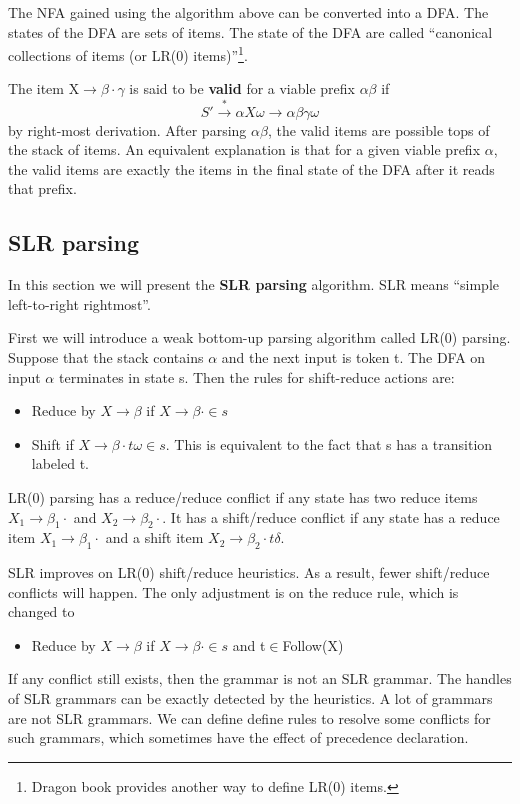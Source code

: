 The NFA gained using the algorithm above can be converted into a DFA. The states of the DFA are sets of items. The state of the DFA are called ``canonical collections of items (or LR(0) items)''\footnote{Dragon book provides another way to define LR(0) items.}.

The item X$\rightarrow\beta\cdot\gamma$ is said to be \textbf{valid} for a viable prefix $\alpha\beta$ if
\begin{equation*}
S' \xrightarrow{*}\alpha X\omega\rightarrow\alpha\beta\gamma\omega
\end{equation*}
by right-most derivation. After parsing $\alpha\beta$, the valid items are possible tops of the stack of items. An equivalent explanation is that for a given viable prefix $\alpha$, the valid items are exactly the items in the final state of the DFA after it reads that prefix.
\subsection{SLR parsing}
In this section we will present the {\bf SLR parsing} algorithm. SLR means ``simple left-to-right rightmost''.

First we will introduce a weak bottom-up parsing algorithm called LR(0) parsing. Suppose that the stack contains $\alpha$ and the next input is token t. The DFA on input $\alpha$ terminates in state s. Then the rules for shift-reduce actions are:
\begin{itemize}
\item Reduce by $X\rightarrow\beta$ if $X\rightarrow\beta\cdot\in s$
\item Shift if $X\rightarrow\beta\cdot t\omega\in s$. This is equivalent to the fact that s has a transition labeled t.
\end{itemize}
LR(0) parsing has a reduce/reduce conflict if any state has two reduce items $X_1\rightarrow\beta_1\cdot$ and $X_2\rightarrow\beta_2\cdot$. It has a shift/reduce conflict if any state has a reduce item $X_1\rightarrow\beta_1\cdot$ and a shift item $X_2\rightarrow\beta_2\cdot t\delta$.

SLR improves on LR(0) shift/reduce heuristics. As a result, fewer shift/reduce conflicts will happen. The only adjustment is on the reduce rule, which is changed to 
\begin{itemize}
\item Reduce by $X\rightarrow\beta$ if $X\rightarrow\beta\cdot\in s$ and t$\in$Follow(X)
\end{itemize}
If any conflict still exists, then the grammar is not an SLR grammar. The handles of SLR grammars can be exactly detected by the heuristics. A lot of grammars are not SLR grammars. We can define define rules to resolve some conflicts for such grammars, which sometimes have the effect of precedence declaration.

